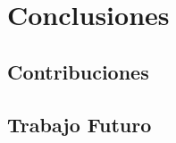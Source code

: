 \chapter{Conclusiones}
\label{chap7:conclusion}


\section{Contribuciones}
\label{chap7:contrib}

\section{Trabajo Futuro}
\label{chap7:Futuro}